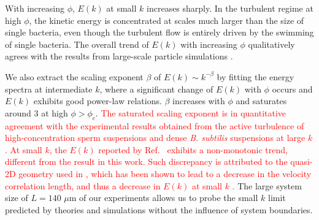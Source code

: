 \documentclass[twocolumn,aps,prx,amsmath,amssymb,longbibliography,superscriptaddress]{revtex4-2}
\begin{document}
With increasing $\phi$, $E(k)$ at small $k$ increases sharply. In the turbulent regime at high $\phi$, the kinetic energy is concentrated at scales much larger than the size of single bacteria, even though the turbulent flow is entirely driven by the swimming of single bacteria. The overall trend of $E(k)$ with increasing $\phi$ qualitatively agrees with the results from large-scale particle simulations \cite{Saintillan2012,Bardfalvy2019}.

We also extract the scaling exponent $\beta$ of $E(k) \sim k^{-\beta}$ by fitting the energy spectra at intermediate $k$, where a significant change of $E(k)$ with $\phi$ occurs and $E(k)$ exhibits good power-law relations. $\beta$ increases with $\phi$ and saturates around 3 at high $\phi > \phi_c$.
\textcolor{red}{The saturated scaling exponent is in quantitative agreement with the experimental results obtained from the active turbulence of high-concentration sperm suspensions and dense \textit{B. subtilis} suspensions at large $k$ \cite{Creppy2015, Wensink2012}. At small $k$, the $E(k)$ reported by Ref.~\cite{Wensink2012} exhibits a non-monotonic trend, different from the result in this work. Such discrepancy is attributed to the quasi-2D geometry used in \cite{Wensink2012}, which has been shown to lead to a decrease in the velocity correlation length, and thus a decrease in $E(k)$ at small $k$ \cite{Guo2018}.}
The large system size of $L = 140$ $\mu$m of our experiments allows us to probe the small $k$ limit predicted by theories and simulations without the influence of system boundaries.
\end{document}
